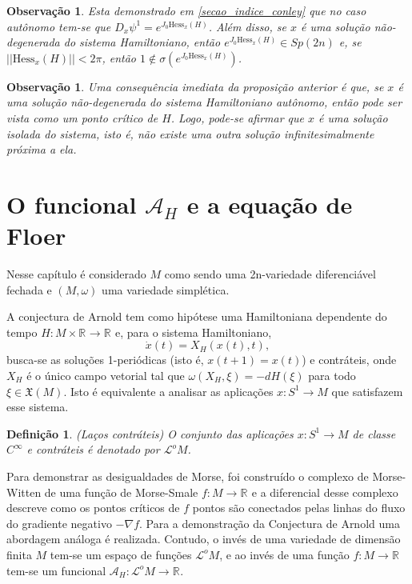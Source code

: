 \documentclass[12pt]{book}
\newtheorem{definicao}[teorema]{Definição}
\newtheorem{observacao}[teorema]{Observação}
\newcommand{\campohamiltonianoabrev}{X_{H}}
\newcommand{\campossuaves}[1]{\mathfrak{X}(#1)}
\newcommand{\circulo}{S^{1}}
\newcommand{\espectrooperador}[1]{\sigma(#1)}
\newcommand{\estruturacomplexa}{J_{0}}
\newcommand{\formaSimpletica}[2]{\omega(#1, #2)}
\newcommand{\funcionalH}{\mathcal{A}_{H}}
\newcommand{\gradiente}{\nabla f}
\newcommand{\gruposimpletico}[1]{Sp(#1)}
\newcommand{\hessianaponto}[2]{\text{Hess}_{#1}(#2)}
\newcommand{\norma}[1]{||#1||}
\newcommand{\real}[1]{\mathbb{R}^{#1}}
\newcommand{\reta}{\real{}}
\newcommand{\lacocontrateis}{\mathcal{L}^{o}M}
\begin{document}
	\begin{observacao}
		Esta demonstrado em \ref{secao_indice_conley} que no caso autônomo tem-se que $D_{x}\psi^{1} = e^{\estruturacomplexa \hessianaponto{x}{H}}$. Além disso, se $x$ é uma solução não-degenerada do sistema Hamiltoniano, então $e^{\estruturacomplexa \hessianaponto{x}{H}} \in \gruposimpletico{2n}$ e, se $\norma{\hessianaponto{x}{H}}<2\pi$, então $1\notin \espectrooperador{e^{\estruturacomplexa \hessianaponto{x}{H}}}$.
	\end{observacao}
	
	\begin{observacao}
		Uma consequência imediata da proposição anterior é que, se $x$ é uma solução não-degenerada do sistema Hamiltoniano autônomo, então pode ser vista como um ponto crítico de $H$. Logo, pode-se afirmar que $x$ é uma solução isolada do sistema, isto é, não existe uma outra solução infinitesimalmente próxima a ela.
	\end{observacao}
	
	
	\section{O funcional $\funcionalH$ e a equação de Floer}\label{secao_funcional_hamiltoniano}
	
	Nesse capítulo é considerado $M$ como sendo uma 2n-variedade diferenciável fechada e $(M, \omega)$ uma variedade simplética.
	
	A conjectura de Arnold tem como hipótese uma Hamiltoniana dependente do tempo $H: M\times \reta \to \reta$ e, para o sistema Hamiltoniano,
	$$
	\dot{x}(t) = X_{H}(x(t), t),
	$$
	busca-se as soluções 1-periódicas (isto é, $x(t+1)=x(t)$) e contráteis, onde $\campohamiltonianoabrev$ é o único campo vetorial tal que $\formaSimpletica{\campohamiltonianoabrev}{\xi} = -dH(\xi)$ para todo $\xi \in \campossuaves{M}$. Isto é equivalente a analisar as aplicações $x : \circulo\to M$ que satisfazem esse sistema.
	
	\begin{definicao}
		(Laços contráteis) O conjunto das aplicações $x:\circulo \to M$ de classe $C^{\infty}$ e contráteis é denotado por $\lacocontrateis$.
	\end{definicao}
	
	Para demonstrar as desigualdades de Morse, foi construído o complexo de Morse-Witten de uma função de Morse-Smale $f: M\to \reta$ e a diferencial desse complexo descreve como os pontos críticos de $f$ pontos são conectados pelas linhas do fluxo do gradiente negativo $-\gradiente$. Para a demonstração da Conjectura de Arnold uma abordagem análoga é realizada. Contudo, o invés de uma variedade de dimensão finita $M$ tem-se um espaço de funções $\lacocontrateis$, e ao invés de uma função $f:M\to \reta$ tem-se um funcional $\funcionalH:\lacocontrateis\to \reta$.
	
\end{document}
